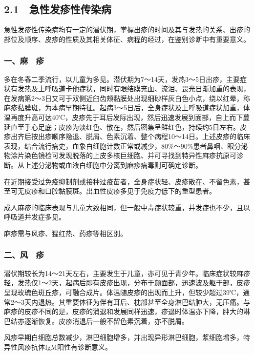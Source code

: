 \subsection{2.1　急性发疹性传染病}

急性发疹性传染病均有一定的潜伏期，掌握出疹的时间及其与发热的关系、出疹的部位及顺序、皮疹的性质及其相关体征、病程的经过，在鉴别诊断中有重要意义。

\subsubsection{一、麻　疹}

多在冬春二季流行，以儿童为多见。潜伏期为7～14天，发热3～5日出疹，主要症状有发热及上呼吸道卡他症状，同时有眼结膜充血、流泪、畏光日渐加重的表现，在发病第2～3日又可于双侧近臼齿颊黏膜处出现细砂样灰白色小点，绕以红晕，称麻疹黏膜斑，为本病早期特征。起病3～5日后，全身症状及上呼吸道症状加重，体温再度升高可达40℃，皮疹先于耳后发际出现，然后迅速发展到面部，自上而下蔓延直至手心足底；皮疹为淡红色、散在，然后密集呈鲜红色，持续约5日左右。皮疹出齐后按出疹顺序隐退、脱屑、色素沉着、整个病程10～14日。上述皮疹的临床表现，结合流行病史，血象白细胞计数正常或减少，80\%～90\%患者鼻咽、眼分泌物涂片染色镜检可发现脱落的上皮多核巨细胞、并可寻找到特异性麻疹抗原可诊断。从上述分泌物或血液白细胞中分离到麻疹病毒则可确定诊断。

在近期接受过免疫抑制剂或接种过疫苗者，全身症状轻、皮疹散在、不留色素，甚至可无皮疹和口腔黏膜斑。出血性皮疹多见于免疫力低下的重型患者。

成人麻疹的临床表现与儿童大致相同，但一般中毒症状较重，并发症也不少，且以呼吸道并发症多见。

麻疹需与风疹、猩红热、药疹等相区别。

\subsubsection{二、风　疹}

潜伏期较长为14～21天左右，主要发生于儿童，亦可见于青少年。临床症状较麻疹轻，发热仅1～2天，起病后即有皮疹出现，分布于颜面部，迅速波及躯干部，皮疹呈现玫瑰色斑丘疹，可融合成片。体温随皮疹的出现而上升，但较少超过39℃，通常2～3天内退热。其重要体征为伴有耳后、枕部甚至全身淋巴结肿大，无压痛。与麻疹的皮疹不同的是，皮疹的消退和发展同样迅速，疹退时体温亦下降，肿大的淋巴结亦逐渐恢复。皮疹消退后一般不留色素沉着，亦不脱屑。

风疹早期白细胞总数减少，淋巴细胞增多，并出现异形淋巴细胞，浆细胞增多，特异性风疹抗体IgM阳性有诊断意义。

